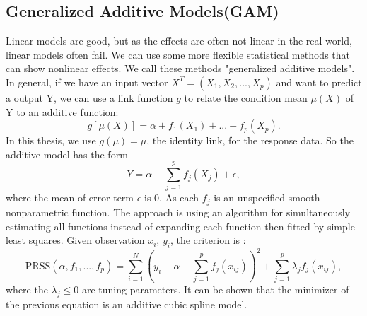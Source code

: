 \documentclass[12pt]{article}
\begin{document}
\subsection{Generalized Additive Models(GAM)} 
Linear models are good, but as the effects are often not linear in the real world, linear models often fail. We can use some more flexible statistical methods that can show nonlinear effects. We call these methods "generalized additive models". In general, if we have an input vector $X^T=(X_1,X_2,...,X_p)$ and want to predict a output Y, we can use a link function $g$ to relate the condition mean $\mu(X)$ of Y to an additive function: $$g[\mu(X)] = \alpha + f_1(X_1) + ... + f_p(X_p).$$ In this thesis, we use $g(\mu) = \mu$, the identity link, for the response data. So the additive model has the form $$Y=\alpha+\sum_{j=1}^{p} f_j(X_j)+\epsilon,$$
where the mean of error term $\epsilon$ is 0. As each $f_j$ is an unspecified smooth nonparametric function. The approach is using an algorithm for simultaneously estimating all functions instead of expanding each function then fitted by simple least squares. Given observation $x_i$, $y_i$, the criterion is : $$\text{PRSS}(\alpha,f_1,...,f_p) = \sum_{i=1}^{N} (y_i-\alpha-\sum_{j=1}^{p}f_j(x_{ij}))^2+\sum_{j=1}^{p} \lambda_jf_j(x_{ij}),$$ where the $\lambda_j \leq 0$ are tuning parameters. It can be shown that the minimizer of the previous equation is an additive cubic spline model. \cite[p.295-299]{friedman2001elements} 
\end{document}
